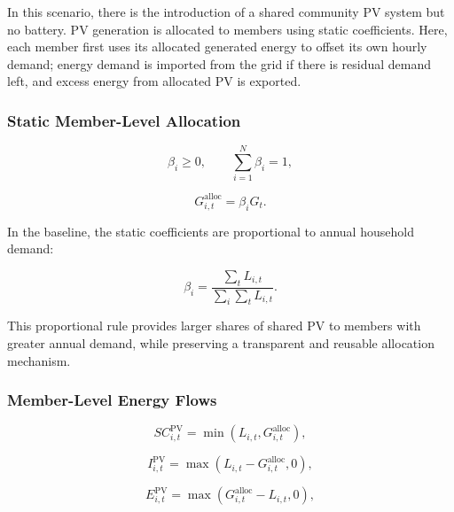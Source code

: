 In this scenario, there is the introduction of a shared community PV system but no battery. PV generation is allocated to members using static coefficients. Here, each member first uses its allocated generated energy to offset its own hourly demand; energy demand is imported from the grid if there is residual demand left, and excess energy from allocated PV is exported.

\subsubsection{Static Member-Level Allocation}
\label{subsec:static_member_allocation_pv_only}

\begin{equation}
\label{eq:beta_condition}
\beta_i \geq 0, \qquad \sum_{i=1}^{N} \beta_i = 1,
\end{equation}

\begin{equation}
\label{eq:allocated_pv}
G^{\mathrm{alloc}}_{i,t} = \beta_i G_t.
\end{equation}

In the baseline, the static coefficients are proportional to annual household demand:

\begin{equation}
\label{eq:beta_annual_demand}
\beta_i = \frac{\sum_t L_{i,t}}{\sum_i \sum_t L_{i,t}}.
\end{equation}

This proportional rule provides larger shares of shared PV to members with greater annual demand, while preserving a transparent and reusable allocation mechanism.

\subsubsection{Member-Level Energy Flows}
\label{subsec:member_level_energy_flows_pv_only}

\begin{equation}
\label{eq:pv_self_consumption_member}
SC^{\mathrm{PV}}_{i,t} = \min\left(L_{i,t}, G^{\mathrm{alloc}}_{i,t}\right),
\end{equation}

\begin{equation}
\label{eq:pv_import_member}
I^{\mathrm{PV}}_{i,t} = \max\left(L_{i,t} - G^{\mathrm{alloc}}_{i,t}, 0\right),
\end{equation}

\begin{equation}
\label{eq:pv_export_member}
E^{\mathrm{PV}}_{i,t} = \max\left(G^{\mathrm{alloc}}_{i,t} - L_{i,t}, 0\right),
\end{equation}

